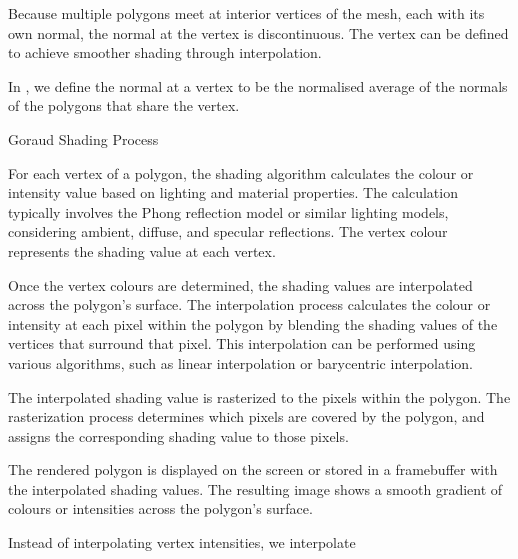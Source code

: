 \documentclass[../COS3712_Notes.tex]{subfiles}
\begin{document}
\begin{descriptimize}
          Because multiple polygons meet at interior vertices of the mesh,
          each with its own normal, the normal at the vertex is discontinuous.
          The vertex can be defined to achieve smoother shading through interpolation.

          In , we define the normal at a vertex to be the normalised
          average of the normals of the polygons that share the vertex.
          \pagebreak
          \begin{sidenote}{Goraud Shading Process}
            $ $\vspace{-1em}
            \begin{descriptenum}
              \item[Vertex Colour Calculation] For each vertex of a polygon, the shading algorithm
                calculates the colour or intensity value based on lighting and material properties.
                The calculation typically involves the Phong reflection model or similar lighting models,
                considering ambient, diffuse, and specular reflections.
                The vertex colour represents the shading value at each vertex.
              \item[Interpolation] Once the vertex colours are determined,
                the shading values are interpolated across the polygon's surface.
                The interpolation process calculates the colour or intensity at each pixel
                within the polygon by blending the shading values of the vertices that surround
                that pixel.
                This interpolation can be performed using various algorithms,
                such as linear interpolation or barycentric interpolation.
              \item[Rasterization] The interpolated shading value is rasterized to the pixels
                within the polygon.
                The rasterization process determines which pixels are covered by the polygon,
                and assigns the corresponding shading value to those pixels.
              \item[Rendering] The rendered polygon is displayed on the screen or stored in a
                framebuffer with the interpolated shading values.
                The resulting image shows a smooth gradient of colours or intensities
                across the polygon's surface.
            \end{descriptenum}
          \end{sidenote}
        \item[Phong Shading] Instead of interpolating vertex intensities, we interpolate

\end{descriptimize}
\end{document}
